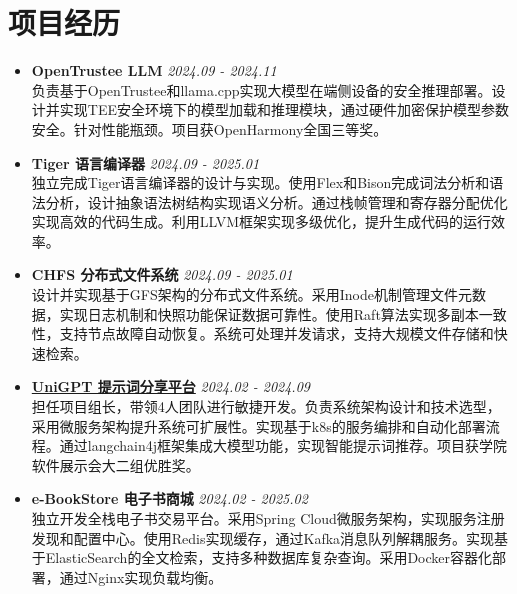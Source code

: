 \documentclass[a4paper]{article}
\begin{document}
\section*{项目经历}
\begin{itemize}[leftmargin=*,label={},itemsep=0.5em,topsep=0.2em]
\item \textbf{OpenTrustee LLM} \hfill \textit{2024.09 - 2024.11}\\
负责基于OpenTrustee和llama.cpp实现大模型在端侧设备的安全推理部署。设计并实现TEE安全环境下的模型加载和推理模块，通过硬件加密保护模型参数安全。针对性能瓶颈。项目获OpenHarmony全国三等奖。

\item \textbf{Tiger 语言编译器} \hfill \textit{2024.09 - 2025.01}\\
独立完成Tiger语言编译器的设计与实现。使用Flex和Bison完成词法分析和语法分析，设计抽象语法树结构实现语义分析。通过栈帧管理和寄存器分配优化实现高效的代码生成。利用LLVM框架实现多级优化，提升生成代码的运行效率。

\item \textbf{CHFS 分布式文件系统} \hfill \textit{2024.09 - 2025.01}\\
设计并实现基于GFS架构的分布式文件系统。采用Inode机制管理文件元数据，实现日志机制和快照功能保证数据可靠性。使用Raft算法实现多副本一致性，支持节点故障自动恢复。系统可处理并发请求，支持大规模文件存储和快速检索。

\item \textbf{\href{https://base.sjtu.edu.cn/se/Awards.html}{UniGPT 提示词分享平台}} \hfill \textit{2024.02 - 2024.09}\\
担任项目组长，带领4人团队进行敏捷开发。负责系统架构设计和技术选型，采用微服务架构提升系统可扩展性。实现基于k8s的服务编排和自动化部署流程。通过langchain4j框架集成大模型功能，实现智能提示词推荐。项目获学院软件展示会大二组优胜奖。

\item \textbf{e-BookStore 电子书商城} \hfill \textit{2024.02 - 2025.02}\\
独立开发全栈电子书交易平台。采用Spring Cloud微服务架构，实现服务注册发现和配置中心。使用Redis实现缓存，通过Kafka消息队列解耦服务。实现基于ElasticSearch的全文检索，支持多种数据库复杂查询。采用Docker容器化部署，通过Nginx实现负载均衡。
\end{itemize}
\end{document}
